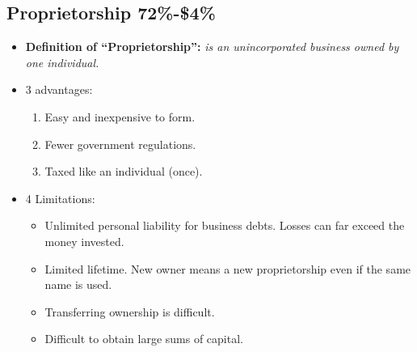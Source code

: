 \documentclass{article}
\renewcommand{\termdefinition}[2]{
    \textbf{Definition of ``#1'':} \emph{#2}
}
\begin{document}
\subsection{Proprietorship 72\%-\$4\%}
\begin{itemize}
    \item \termdefinition{Proprietorship}{ is an unincorporated business owned by one individual. }
    \item 3 advantages: 
        \begin{enumerate}
            \item Easy and inexpensive to form.
            \item Fewer government regulations. 
            \item Taxed like an individual (once). 
        \end{enumerate}
    
    \item 4 Limitations:
        \begin{itemize}
            \item Unlimited personal liability for business debts. Losses can far exceed the money invested. 
            \item Limited lifetime. New owner means a new proprietorship even if the same name is used. 
            \item Transferring ownership is difficult. 
            \item Difficult to obtain large sums of capital. 
        \end{itemize}
\end{itemize}
\end{document}
